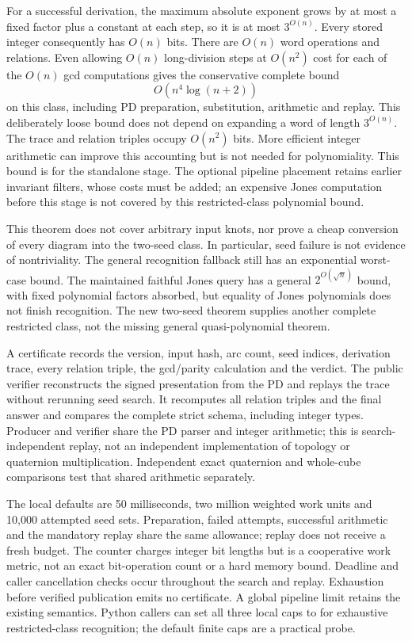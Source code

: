 For a successful derivation, the maximum absolute exponent grows by at most
a fixed factor plus a constant at each step, so it is at most $3^{O(n)}$.
Every stored integer consequently has $O(n)$ bits. There are $O(n)$ word
operations and relations. Even allowing $O(n)$ long-division steps at
$O(n^2)$ cost for each of the $O(n)$ gcd computations gives the conservative
complete bound
\[
 O(n^4\log(n+2))
\]
on this class, including PD preparation, substitution, arithmetic and replay.
This deliberately loose bound does not depend on expanding a word of length
$3^{O(n)}$. The trace and relation triples occupy $O(n^2)$ bits. More efficient
integer arithmetic can improve this accounting but is not needed for
polynomiality. This bound is for the standalone stage. The optional pipeline
placement retains earlier invariant filters, whose costs must be added;
an expensive Jones computation before this stage is not covered by this
restricted-class polynomial bound.

This theorem does not cover arbitrary input knots, nor prove a cheap
conversion of every diagram into the two-seed class. In particular, seed
failure is not evidence of nontriviality. The general recognition fallback
still has an exponential worst-case bound. The maintained faithful Jones
query has a general $2^{O(\sqrt n)}$ bound, with fixed polynomial factors
absorbed, but equality of Jones polynomials does not finish recognition.
The new two-seed theorem supplies another complete restricted class, not the
missing general quasi-polynomial theorem.

A certificate records the version, input hash, arc count, seed indices,
derivation trace, every relation triple, the gcd/parity calculation and the
verdict. The public verifier reconstructs the signed presentation from the
PD and replays the trace without rerunning seed search. It recomputes all
relation triples and the final answer and compares the complete strict
schema, including integer types. Producer and verifier share the PD parser
and integer arithmetic; this is search-independent replay, not an independent
implementation of topology or quaternion multiplication. Independent exact
quaternion and whole-cube comparisons test that shared arithmetic separately.

The local defaults are 50 milliseconds, two million weighted work units and
10,000 attempted seed sets. Preparation, failed attempts, successful
arithmetic and the mandatory replay share the same allowance; replay does
not receive a fresh budget. The counter charges integer bit lengths but is a
cooperative work metric, not an exact bit-operation count or a hard memory
bound. Deadline and caller cancellation checks occur throughout the search
and replay. Exhaustion before verified publication emits no certificate.
A global pipeline limit retains the existing  semantics.
Python callers can set all three local caps to  for exhaustive
restricted-class recognition; the default finite caps are a practical probe.

